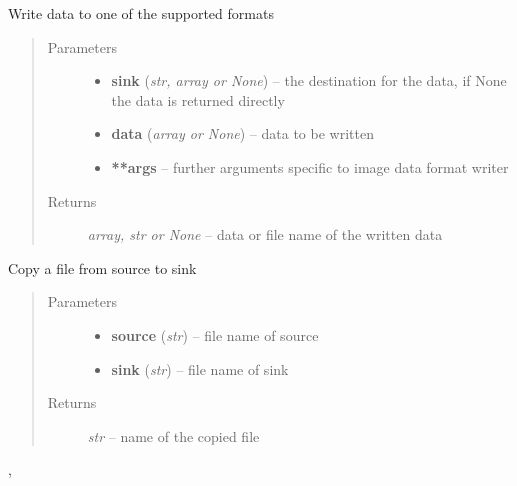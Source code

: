 \documentclass[letterpaper,10pt,english]{sphinxmanual}
\begin{document}
\begin{fulllineitems}
\label{api/ClearMap.IO:ClearMap.IO.IO.writeData}
Write data to one of the supported formats
\begin{quote}\begin{description}
\item[{Parameters}] \leavevmode\begin{itemize}
\item {} 
\textbf{sink} (\emph{str, array or None}) --
the destination for the data, if None the data is returned directly

\item {} 
\textbf{data} (\emph{array or None}) --
data to be written

\item {} 
\textbf{**args} --
further arguments specific to image data format writer

\end{itemize}

\item[{Returns}] \leavevmode
\emph{array, str or None} --
data or file name of the written data

\end{description}\end{quote}




{\hyperref[api/ClearMap.IO:ClearMap.IO.IO.readData]{\emph{}}}



\end{fulllineitems}


\begin{fulllineitems}
\label{api/ClearMap.IO:ClearMap.IO.IO.copyFile}
Copy a file from source to sink
\begin{quote}\begin{description}
\item[{Parameters}] \leavevmode\begin{itemize}
\item {} 
\textbf{source} (\emph{str}) --
file name of source

\item {} 
\textbf{sink} (\emph{str}) --
file name of sink

\end{itemize}

\item[{Returns}] \leavevmode
\emph{str} --
name of the copied file

\end{description}\end{quote}




{\hyperref[api/ClearMap.IO:ClearMap.IO.IO.copyData]{\emph{}}}, {\hyperref[api/ClearMap.IO:ClearMap.IO.IO.convertData]{\emph{}}}



\end{fulllineitems}
\end{document}
